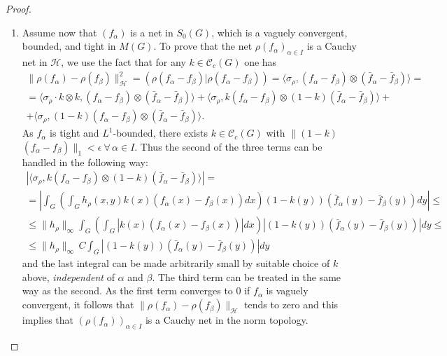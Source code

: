 \documentclass[graybox]{svmult}
\begin{document}
\begin{proof}\
\begin{enumerate}
\item[(a)] Assume now that $(f_\alpha)$ is a net in ${S_{0}(G)}$, which  is a vaguely
convergent, bounded, and tight in $M(G)$.
To prove that the net
$\rho(f_{\alpha})_{\alpha \in I}$ is a Cauchy net
in $\mathcal{H}$, we use the fact that for any $k \in \mathcal{C}_c(G)$
one has
\begin{gather*}
\| \rho (f_{\alpha }){-}\rho (f_{\beta })\| ^{2}_{\mathcal{H}}
{=} (\rho (f_{\alpha }-f_{\beta })| \rho (f_{\alpha }-f_{\beta })) {=}
\langle\sigma _{\rho},(f_{\alpha }{-}f_{\beta })\otimes (\bar{f}_{\alpha
}{-}\bar{f}_{\beta })\rangle {=} \\
{=} \langle\sigma _{\rho} \cdot k \otimes k,(f_{\alpha }{-}f_{\beta
})\otimes
(\bar{f}_{\alpha }-\bar{f}_{\beta })\rangle + \langle\sigma _{\rho},k(f_{\alpha }-f_{\beta })\otimes (1-k)(\bar{f}_{\alpha
}-\bar{f}_{\beta })\rangle + \\
+ \langle\sigma _{\rho},(1-k)(f_{\alpha }-f_{\beta })\otimes
(\bar{f}_{\alpha }-\bar{f}_{\beta })\rangle.
\end{gather*}
As $f_{\alpha}$ is tight and $L^{1}$-bounded,
there exists $k \in  \mathcal{C}_c(G)$ with
$\| (1-k)$\break $(f_{\alpha } - f_{\beta })
\| _{1}< \epsilon  \ \forall \,  \alpha  \in I$. Thus
the second of the three terms can be handled in the following way:
\begin{gather*}
| \langle\sigma _{\rho},k(f_{\alpha }-f_{\beta })\otimes
(1-k)(\bar{f}_{\alpha }-\bar{f}_{\beta })\rangle| =
\\
{=} \left| \int^{}_{G} \left( \int^{}_{G}
h_{\rho}(x,y)k(x)(f_{\alpha }(x){-}f_{\beta }(x)) dx \right) (1{-}k(y))(\bar{f}_{\alpha }(y){-}\bar{f}_{\beta
}(y)) dy \right| \le
\\
\le  \| h_{\rho}\| _{\infty
} \int^{}_{G}    \left( \int^{}_{G} | k(x)(f_{\alpha }(x){-}f_{\beta }(x))|  dx \right) |
(1{-}k(y))(\bar{f}_{\alpha }(y)-\bar{f}_{\beta }(y))|  dy \le \\
\le  \| h_{\rho}\| _{\infty } \, C \int^{}_{G} |
(1-k(y))(\bar{f}_{\alpha }(y)-\bar{f}_{\beta }(y))|  dy
\end{gather*}
and the last integral can be made arbitrarily small by suitable
choice of $k$ above, \textit{independent} of $\alpha$ and $\beta$.
The third term can be treated in the same way as the second.
As the first term  converges to  0 if $f_{\alpha}$
is  vaguely convergent, it follows that
$\| \rho (f_{\alpha}) - \rho (f_{\beta})\| _{\mathcal{H}}$
tends to zero and this implies
that $(\rho (f_{\alpha }))_{\alpha \in I}$
is a Cauchy net in the norm topology.


\end{enumerate}
\end{proof}
\end{document}
